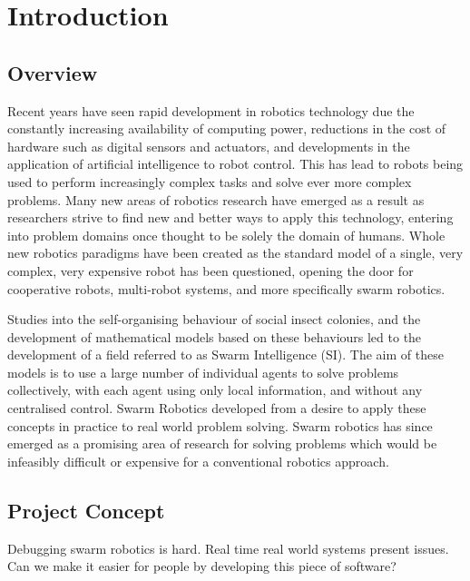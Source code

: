 
\chapter[Introduction]{Introduction} %

\label{Chapter1} %


\newcommand{\keyword}[1]{\textbf{#1}}
\newcommand{\tabhead}[1]{\textbf{#1}}
\newcommand{\code}[1]{\texttt{#1}}
\newcommand{\file}[1]{\texttt{\bfseries#1}}
\newcommand{\option}[1]{\texttt{\itshape#1}}


\section{Overview}
Recent years have seen rapid development in robotics technology due the constantly increasing availability of computing power, reductions in the cost of hardware such as digital sensors and actuators, and developments in the application of artificial intelligence to robot control. This has lead to robots being used to perform increasingly complex tasks and solve ever more complex problems. Many new areas of robotics research have emerged as a result as researchers strive to find new and better ways to apply this technology, entering into problem domains once thought to be solely the domain of humans. Whole new robotics paradigms have been created as the standard model of a single, very complex, very expensive robot has been questioned, opening the door for cooperative robots, multi-robot systems, and more specifically swarm robotics.

Studies into the self-organising behaviour of social insect colonies, and the development of mathematical models based on these behaviours  led to the development of a field referred to as Swarm Intelligence (SI). The aim of these models is to use a large number of individual agents to solve problems collectively, with each agent using only local information, and without any centralised control. Swarm Robotics developed from a desire to apply these concepts in practice to real world problem solving. Swarm robotics has since emerged as a promising area of research for solving problems which would be infeasibly difficult or expensive for a conventional robotics approach.



\section{Project Concept}
Debugging swarm robotics is hard. Real time real world systems present issues. Can we make it easier for people by developing this piece of software?

